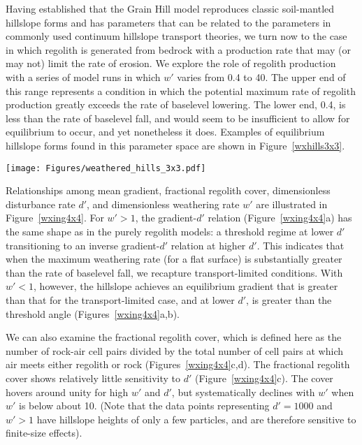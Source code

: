 \documentclass[esurf, manuscript]{copernicus}
\begin{document}
Having established that the Grain Hill model reproduces classic soil-mantled hillslope forms and has parameters that can be related to the parameters in commonly used continuum hillslope transport theories, we turn now to the case in which regolith is generated from bedrock with a production rate that may (or may not) limit the rate of erosion.  We explore the role of regolith production with a series of model runs in which $w'$ varies from 0.4 to 40. The upper end of this range represents a condition in which the potential maximum rate of regolith production greatly exceeds the rate of baselevel lowering. The lower end, 0.4, is less than the rate of baselevel fall, and would seem to be insufficient to allow for equilibrium to occur, and yet nonetheless it does. %
Examples of equilibrium hillslope forms found in this parameter space are shown in Figure~\ref{wxhills3x3}.

\begin{figure*}[t]
\texttt{[image: Figures/weathered\_hills\_3x3.pdf]}
\caption{Final equilibrium profiles from Grain Hill runs with rock and weathering. Domain size is 222 rows by 257 columns, and uplift interval ranges from 100 to 10,000 years.}
\label{wxhills3x3}
\end{figure*}


Relationships among mean gradient, fractional regolith cover, dimensionless disturbance rate $d'$, and dimensionless weathering rate $w'$ are illustrated in Figure~\ref{wxing4x4}. For $w' > 1$, the gradient-$d'$ relation (Figure~\ref{wxing4x4}a) has the same shape as in the purely regolith models: a threshold regime at lower $d'$ transitioning to an inverse gradient-$d'$ relation at higher $d'$. This indicates that when the maximum weathering rate (for a flat surface) is substantially greater than the rate of baselevel fall, we recapture transport-limited conditions. With $w'<1$, however, the hillslope achieves an equilibrium gradient that is greater than that for the transport-limited case, and at lower $d'$, is greater than the threshold angle (Figures~\ref{wxing4x4}a,b).

We can also examine the fractional regolith cover, which is defined here as the number of rock-air cell pairs divided by the total number of cell pairs at which air meets either regolith or rock (Figures~\ref{wxing4x4}c,d). The fractional regolith cover shows relatively little sensitivity to $d'$ (Figure~\ref{wxing4x4}c). The cover hovers around unity for high $w'$ and $d'$, but systematically declines with $w'$ when $w'$ is below about 10. (Note that the data points representing $d' = 1000$ and $w' > 1$ have hillslope heights of only a few particles, and are therefore sensitive to finite-size effects).
\end{document}
